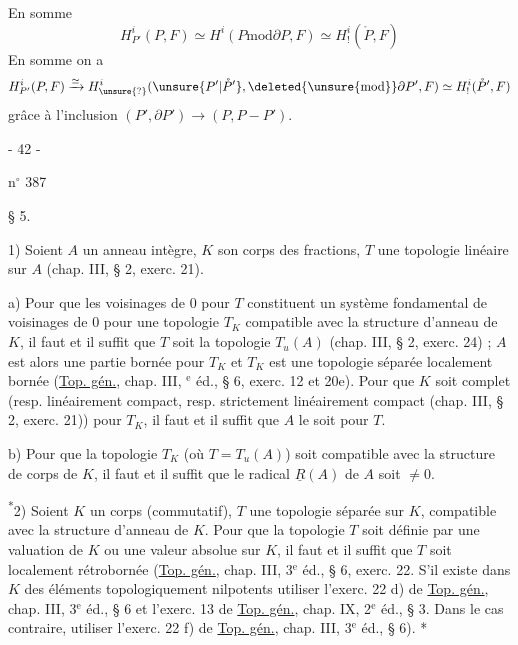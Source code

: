 En somme
\[
H^i_{P'}(P,F)\simeq H^i(P\mathbin{\mathrm{mod}}\partial P,F)\simeq H_!^i(\mathring P,F)
\]
En somme on a
\[
H^i_{P'}(P,F)\xrightarrow{\simeq}H^i_{\unsure{?}}(\unsure{P'|\mathring P'},\deleted{\unsure{\mathrm{mod}}}\partial P',F)\simeq H_!^i(\mathring P',F)
\]
grâce à l'inclusion $(P',\partial P')\longrightarrow(P,P-P')$.
\begin{center}- 42 -\end{center}
\hfill n$^\circ$ 387
\begin{center}§ 5.\end{center}

1) Soient $A$ un anneau intègre, $K$ son corps des fractions, $T$ une topologie linéaire sur $A$ (chap. III, § 2, exerc. 21).

a) Pour que les voisinages de $0$ pour $T$ constituent un système fondamental de voisinages de $0$ pour une topologie $T_K$ compatible avec la structure d'anneau de $K$, il faut et il suffit que $T$ soit la topologie $T_u(A)$ (chap. III, § 2, exerc. 24) ; $A$ est alors une partie bornée pour $T_K$ et $T_K$ est une topologie séparée localement bornée (\uline{Top. gén.}, chap. III, $^{\mathrm e}$ éd., § 6, exerc. 12 et 20e). Pour que $K$ soit complet (resp. linéairement compact, resp. strictement linéairement compact (chap. III, § 2, exerc. 21)) pour $T_K$, il faut et il suffit que $A$ le soit pour $T$.

b) Pour que la topologie $T_K$ (où $T=T_u(A)$) soit compatible avec la structure de corps de $K$, il faut et il suffit que le radical $\underline R(A)$ de $A$ soit $\ne0$.

\textsuperscript{*}2) Soient $K$ un corps (commutatif), $T$ une topologie séparée sur $K$, compatible avec la structure d'anneau de $K$. Pour que la topologie $T$ soit définie par une valuation de $K$ ou une valeur absolue sur $K$, il faut et il suffit que $T$ soit localement rétrobornée (\uline{Top. gén.}, chap. III, 3$^{\mathrm e}$ éd., § 6, exerc. 22. S'il existe dans $K$ des éléments topologiquement nilpotents utiliser l'exerc. 22 d) de \uline{Top. gén.}, chap. III, 3$^{\mathrm e}$ éd., § 6 et l'exerc. 13 de \uline{Top. gén.}, chap. IX, 2$^{\mathrm e}$ éd., § 3. Dans le cas contraire, utiliser l'exerc. 22 f) de \uline{Top. gén.}, chap. III, 3$^{\mathrm e}$ éd., § 6). *

